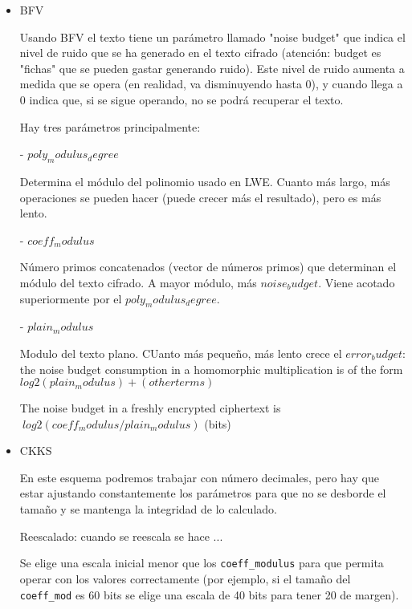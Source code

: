 \begin{itemize}

  \item BFV

  Usando BFV el texto tiene un parámetro llamado "noise budget" que indica el nivel de ruido que se ha generado en el texto cifrado (atención: budget es "fichas" que se pueden gastar generando ruido). Este nivel de ruido aumenta a medida que se opera (en realidad, va disminuyendo hasta 0), y cuando llega a 0 indica que, si se sigue operando, no se podrá recuperar el texto.


  Hay tres parámetros principalmente:

  - $poly_modulus_degree$

  Determina el módulo del polinomio usado en LWE. Cuanto más largo, más operaciones se pueden hacer (puede crecer más el resultado), pero es más lento.

  - $coeff_modulus$

  Número primos concatenados (vector de números primos) que determinan el módulo del texto cifrado. A mayor módulo, más $noise_budget$. Viene acotado superiormente por el $poly_modulus_degree$.

  - $plain_modulus$

  Modulo del texto plano. CUanto más pequeño, más lento crece el $error_budget$: the noise budget consumption in a homomorphic multiplication is of the form $log2(plain_modulus) + (other terms)$

  The noise budget in a freshly encrypted ciphertext is $~ log2(coeff_modulus/plain_modulus)$  (bits)


  \item CKKS

  En este esquema podremos trabajar con número decimales, pero hay que estar ajustando constantemente los parámetros para que no se desborde el tamaño y se mantenga la integridad de lo calculado.

  Reescalado: cuando se reescala se hace ...

  Se elige una escala inicial menor que los \verb|coeff_modulus| para que permita operar con los valores correctamente (por ejemplo, si el tamaño del \verb|coeff_mod| es 60 bits se elige una escala de 40 bits para tener 20 de margen).


\end{itemize}
